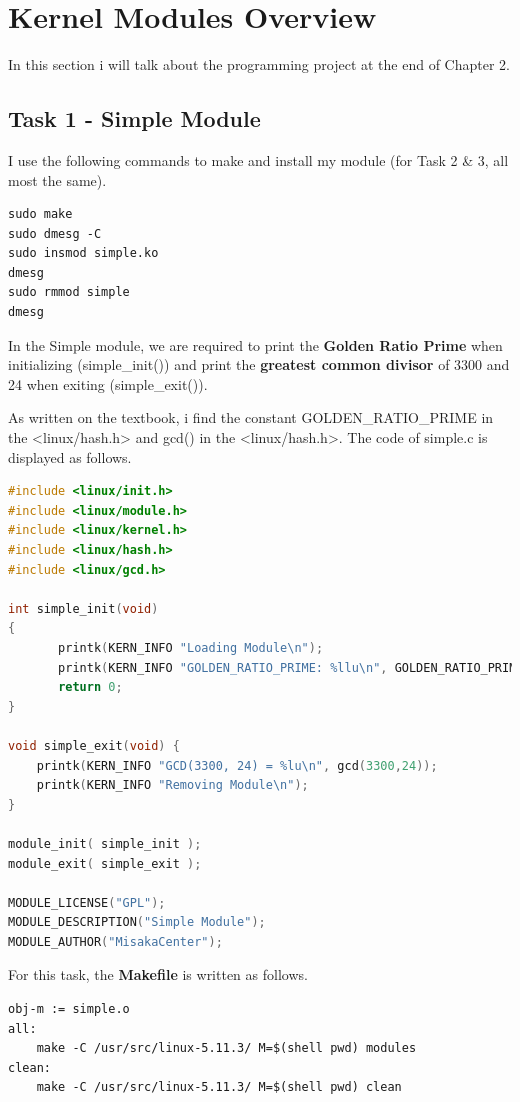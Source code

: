 \documentclass[UTF8,10pt,a4paper]{article}
\theoremstyle{Problem}
\theoremstyle{Solution}
\begin{document}
\section{Kernel Modules Overview}
In this section i will talk about the programming project at the end of Chapter 2.
\subsection{Task 1 - Simple Module}

I use the following commands to make and install my module (for Task 2 & 3, all most the same).
\begin{lstlisting}
sudo make
sudo dmesg -C
sudo insmod simple.ko
dmesg
sudo rmmod simple
dmesg
\end{lstlisting}


In the Simple module, we are required to print the \textbf{Golden Ratio Prime} when initializing (simple\_init()) and print the \textbf{greatest common divisor} of 3300 and 24 when exiting (simple\_exit()).

As written on the textbook, i find the constant GOLDEN\_RATIO\_PRIME in the <linux/hash.h> and gcd() in the <linux/hash.h>. The code of simple.c is displayed as follows.

\begin{lstlisting}[language = c]
#include <linux/init.h>
#include <linux/module.h>
#include <linux/kernel.h>
#include <linux/hash.h>
#include <linux/gcd.h>

int simple_init(void)
{
       printk(KERN_INFO "Loading Module\n");
       printk(KERN_INFO "GOLDEN_RATIO_PRIME: %llu\n", GOLDEN_RATIO_PRIME);
       return 0;
}

void simple_exit(void) {
	printk(KERN_INFO "GCD(3300, 24) = %lu\n", gcd(3300,24));
	printk(KERN_INFO "Removing Module\n");
}

module_init( simple_init );
module_exit( simple_exit );

MODULE_LICENSE("GPL");
MODULE_DESCRIPTION("Simple Module");
MODULE_AUTHOR("MisakaCenter");
\end{lstlisting}

For this task, the \textbf{Makefile} is written as follows.
\begin{lstlisting}
obj-m := simple.o
all:
	make -C /usr/src/linux-5.11.3/ M=$(shell pwd) modules
clean:
	make -C /usr/src/linux-5.11.3/ M=$(shell pwd) clean
\end{lstlisting}
\end{document}
